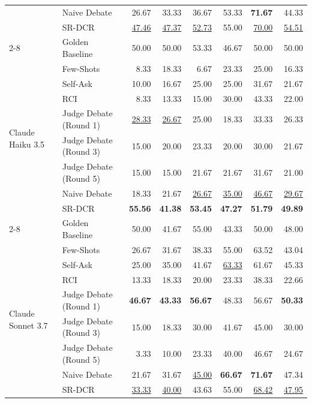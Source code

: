 \documentclass[11pt]{article}
\begin{document}
\begin{table}[ht]
{\begin{tabular}{llrrrrrr}
     & Naive Debate & 26.67 & 33.33 & 36.67 & 53.33 & \textbf{71.67} & 44.33 \\
     & SR-DCR & \underline{47.46} & \underline{47.37} & \underline{52.73} & 55.00 & \underline{70.00} & \underline{54.51} \\
    \cmidrule(lr){2-8}
     & Golden Baseline & 50.00 & 50.00 & 53.33 & 46.67 & 50.00 & 50.00 \\
    \midrule
    \multirow{8}{*}{Claude Haiku 3.5}
     & Few-Shots & 8.33 & 18.33 & 6.67 & 23.33 & 25.00 & 16.33 \\
     & Self-Ask & 10.00 & 16.67 & 25.00 & 25.00 & 31.67 & 21.67 \\
     & RCI & 8.33 & 13.33 & 15.00 & 30.00 & 43.33 & 22.00 \\
     & Judge Debate (Round 1) & \underline{28.33} & \underline{26.67} & 25.00 & 18.33 & 33.33 & 26.33 \\
     & Judge Debate (Round 3) & 15.00 & 20.00 & 23.33 & 20.00 & 30.00 & 21.67 \\
     & Judge Debate (Round 5) & 15.00 & 15.00 & 21.67 & 21.67 & 31.67 & 21.00 \\
     & Naive Debate & 18.33 & 21.67 & \underline{26.67} & \underline{35.00} & \underline{46.67} & \underline{29.67} \\
     & SR-DCR & \textbf{55.56} & \textbf{41.38} & \textbf{53.45} & \textbf{47.27} & \textbf{51.79} & \textbf{49.89} \\
    \cmidrule(lr){2-8}
     & Golden Baseline & 50.00 & 41.67 & 55.00 & 43.33 & 50.00 & 48.00 \\
     \midrule
     \multirow{8}{*}{Claude Sonnet 3.7}
     & Few-Shots & 26.67 & 31.67 & 38.33 & 55.00 & 63.52 & 43.04 \\
     & Self-Ask & 25.00 & 35.00 & 41.67 & \underline{63.33} & 61.67 & 45.33 \\
     & RCI & 13.33 & 18.33 & 20.00 & 23.33 & 38.33 & 22.66 \\
     & Judge Debate (Round 1) & \textbf{46.67} & \textbf{43.33} & \textbf{56.67} & 48.33 & 56.67 & \textbf{50.33} \\
     & Judge Debate (Round 3) & 15.00 & 18.33 & 30.00 & 41.67 & 45.00 & 30.00 \\
     & Judge Debate (Round 5) & 3.33 & 10.00 & 23.33 & 40.00 & 46.67 & 24.67 \\
     & Naive Debate & 21.67 & 31.67 & \underline{45.00} & \textbf{66.67} & \textbf{71.67} & 47.34 \\
     & SR-DCR & \underline{33.33} & \underline{40.00} & 43.63 & 55.00 & \underline{68.42} & \underline{47.95} \\

\end{tabular}}
\end{table}
\end{document}
